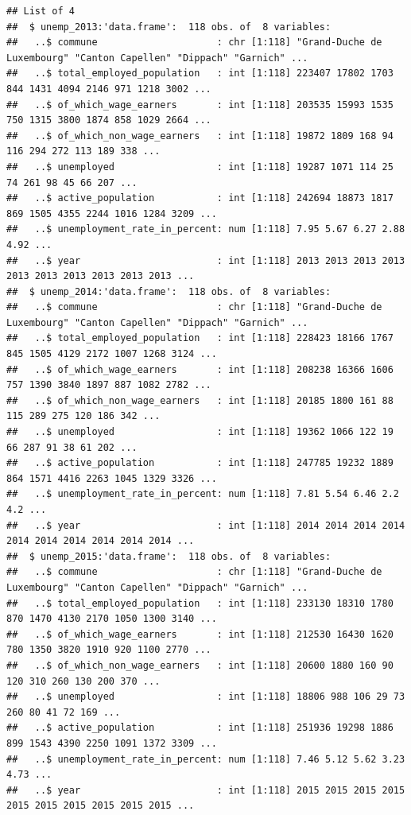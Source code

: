 \documentclass[]{gitbook}
\theoremstyle{definition}
\theoremstyle{definition}
\theoremstyle{definition}
\theoremstyle{remark}
\begin{document}
\begin{verbatim}
## List of 4
##  $ unemp_2013:'data.frame':  118 obs. of  8 variables:
##   ..$ commune                     : chr [1:118] "Grand-Duche de Luxembourg" "Canton Capellen" "Dippach" "Garnich" ...
##   ..$ total_employed_population   : int [1:118] 223407 17802 1703 844 1431 4094 2146 971 1218 3002 ...
##   ..$ of_which_wage_earners       : int [1:118] 203535 15993 1535 750 1315 3800 1874 858 1029 2664 ...
##   ..$ of_which_non_wage_earners   : int [1:118] 19872 1809 168 94 116 294 272 113 189 338 ...
##   ..$ unemployed                  : int [1:118] 19287 1071 114 25 74 261 98 45 66 207 ...
##   ..$ active_population           : int [1:118] 242694 18873 1817 869 1505 4355 2244 1016 1284 3209 ...
##   ..$ unemployment_rate_in_percent: num [1:118] 7.95 5.67 6.27 2.88 4.92 ...
##   ..$ year                        : int [1:118] 2013 2013 2013 2013 2013 2013 2013 2013 2013 2013 ...
##  $ unemp_2014:'data.frame':  118 obs. of  8 variables:
##   ..$ commune                     : chr [1:118] "Grand-Duche de Luxembourg" "Canton Capellen" "Dippach" "Garnich" ...
##   ..$ total_employed_population   : int [1:118] 228423 18166 1767 845 1505 4129 2172 1007 1268 3124 ...
##   ..$ of_which_wage_earners       : int [1:118] 208238 16366 1606 757 1390 3840 1897 887 1082 2782 ...
##   ..$ of_which_non_wage_earners   : int [1:118] 20185 1800 161 88 115 289 275 120 186 342 ...
##   ..$ unemployed                  : int [1:118] 19362 1066 122 19 66 287 91 38 61 202 ...
##   ..$ active_population           : int [1:118] 247785 19232 1889 864 1571 4416 2263 1045 1329 3326 ...
##   ..$ unemployment_rate_in_percent: num [1:118] 7.81 5.54 6.46 2.2 4.2 ...
##   ..$ year                        : int [1:118] 2014 2014 2014 2014 2014 2014 2014 2014 2014 2014 ...
##  $ unemp_2015:'data.frame':  118 obs. of  8 variables:
##   ..$ commune                     : chr [1:118] "Grand-Duche de Luxembourg" "Canton Capellen" "Dippach" "Garnich" ...
##   ..$ total_employed_population   : int [1:118] 233130 18310 1780 870 1470 4130 2170 1050 1300 3140 ...
##   ..$ of_which_wage_earners       : int [1:118] 212530 16430 1620 780 1350 3820 1910 920 1100 2770 ...
##   ..$ of_which_non_wage_earners   : int [1:118] 20600 1880 160 90 120 310 260 130 200 370 ...
##   ..$ unemployed                  : int [1:118] 18806 988 106 29 73 260 80 41 72 169 ...
##   ..$ active_population           : int [1:118] 251936 19298 1886 899 1543 4390 2250 1091 1372 3309 ...
##   ..$ unemployment_rate_in_percent: num [1:118] 7.46 5.12 5.62 3.23 4.73 ...
##   ..$ year                        : int [1:118] 2015 2015 2015 2015 2015 2015 2015 2015 2015 2015 ...

\end{verbatim}
\end{document}
